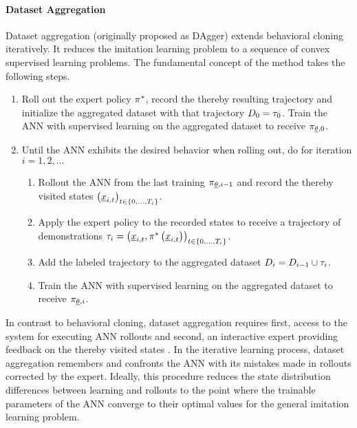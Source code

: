 \paragraph*{Dataset Aggregation}$\ $\\
Dataset aggregation (originally proposed as DAgger\cite{Ross2010}) 
extends behavioral cloning iteratively.
It reduces the imitation learning problem 
to a sequence of convex supervised learning problems.
The fundamental concept of the method takes the following steps.
\begin{enumerate}
    \item 
    Roll out the expert policy $\pi^*$,
    record the thereby resulting trajectory
    and initialize the aggregated dataset with that trajectory
    $D_0 = \tau_0$.
    Train the ANN with supervised learning on the aggregated dataset
    to receive
    $\pi_{\underline{\theta}, 0}$.
    \item Until the ANN exhibits the desired behavior when rolling out, 
    do for iteration $i = 1,2,\dots$
    \begin{enumerate}
        \item Rollout the ANN from the last training
        $\pi_{\underline{\theta}, i-1}$
        and record the thereby visited states
        $\left({\underline{x}_{i,t}}\right)_{t\in \left\{{0, \dots, T_i}\right\}}$.
        \item Apply the expert policy to the recorded states 
        to receive a trajectory of demonstrations
        $\tau_i = \left({\underline{x}_{i,t}, 
    \pi^*\left({\underline{x}_{i,t}}\right)}\right)
    _{t \in \left\{{0, \dots, T_i}\right\}}$.
        \item Add the labeled trajectory to the aggregated dataset
        $D_i = D_{i-1} \cup \tau_i$.
        \item Train the ANN with supervised learning on the aggregated dataset
        to receive
        $\pi_{\underline{\theta}, i}$.
    \end{enumerate}
\end{enumerate}
In contrast to behavioral cloning,
dataset aggregation requires first, 
access to the system for executing ANN rollouts
and second, 
an interactive expert providing feedback 
on the thereby visited states \cite{yue2018imitation}.
In the iterative learning process,
dataset aggregation
remembers and confronts the ANN with
its mistakes made in rollouts corrected by the expert.
Ideally, this procedure reduces the 
state distribution differences between learning and rollouts
to the point where
the trainable parameters of the ANN converge to their
optimal values for the general imitation learning problem.





